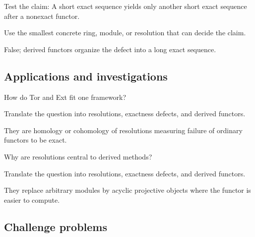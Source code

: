 \begin{exercise}\label{exr:v28-expand-12}
Test the claim: A short exact sequence yields only another short exact sequence after a nonexact functor.
\end{exercise}
\begin{hint}
Use the smallest concrete ring, module, or resolution that can decide the claim.
\end{hint}
\begin{solution}
False; derived functors organize the defect into a long exact sequence.
\end{solution}

\subsection*{Applications and investigations}

\begin{exercise}\label{exr:v28-expand-13}
How do Tor and Ext fit one framework?
\end{exercise}
\begin{hint}
Translate the question into resolutions, exactness defects, and derived functors.
\end{hint}
\begin{solution}
They are homology or cohomology of resolutions measuring failure of ordinary functors to be exact.
\end{solution}

\begin{exercise}\label{exr:v28-expand-14}
Why are resolutions central to derived methods?
\end{exercise}
\begin{hint}
Translate the question into resolutions, exactness defects, and derived functors.
\end{hint}
\begin{solution}
They replace arbitrary modules by acyclic projective objects where the functor is easier to compute.
\end{solution}

\subsection*{Challenge problems}

